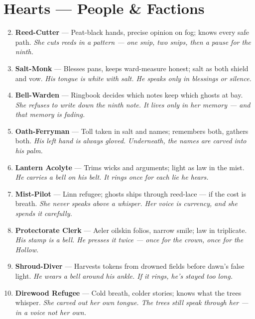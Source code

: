\section*{Hearts --- People \& Factions}
\label{sec:mistlands-people}
\begin{enumerate}
\setcounter{enumi}{1}
\item \textbf{Reed-Cutter} --- Peat-black hands, precise opinion on fog; knows every safe path. 
  \hfill \textit{She cuts reeds in a pattern --- one snip, two snips, then a pause for the ninth.}
\item \textbf{Salt-Monk} --- Blesses pans, keeps ward-measure honest; salt as both shield and vow. 
  \hfill \textit{His tongue is white with salt. He speaks only in blessings or silence.}
\item \textbf{Bell-Warden} --- Ringbook decides which notes keep which ghosts at bay. 
  \hfill \textit{She refuses to write down the ninth note. It lives only in her memory --- and that memory is fading.}
\item \textbf{Oath-Ferryman} --- Toll taken in salt and names; remembers both, gathers both.  
  \hfill \textit{His left hand is always gloved. Underneath, the names are carved into his palm.}
\item \textbf{Lantern Acolyte} --- Trims wicks and arguments; light as law in the mist. 
  \hfill \textit{He carries a bell on his belt. It rings once for each lie he hears.}
\item \textbf{Mist-Pilot} --- Linn refugee; ghosts ships through reed-lace --- if the cost is breath. 
  \hfill \textit{She never speaks above a whisper. Her voice is currency, and she spends it carefully.}
\item \textbf{Protectorate Clerk} --- Aeler oilskin folios, narrow smile; law in triplicate. 
  \hfill \textit{His stamp is a bell. He presses it twice --- once for the crown, once for the Hollow.}
\item \textbf{Shroud-Diver} --- Harvests tokens from drowned fields before dawn's false light.  
  \hfill \textit{He wears a bell around his ankle. If it rings, he's stayed too long.}
\item \textbf{Direwood Refugee} --- Cold breath, colder stories; knows what the trees whisper. 
  \hfill \textit{She carved out her own tongue. The trees still speak through her --- in a voice not her own.}

\end{enumerate}
